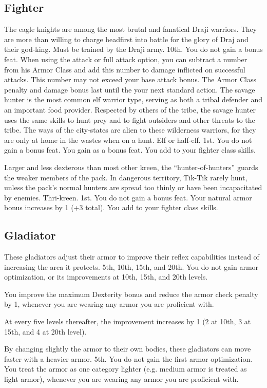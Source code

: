 \subsection{Fighter}
{The eagle knights are among the most brutal and fanatical Draji warriors. They are more than willing to charge headfirst into battle for the glory of Draj and their god-king.}
{Must be trained by the Draji army.}
{10th.}
{You do not gain a bonus feat.}
{
	When using the attack or full attack option, you can subtract a number from his Armor Class and add this number to damage inflicted on successful attacks. This number may not exceed your base attack bonus. The Armor Class penalty and damage bonus last until the your next standard action.
}
{The savage hunter is the most common elf warrior type, serving as both a tribal defender and an important food provider. Respected by others of the tribe, the savage hunter uses the same skills to hunt prey and to fight outsiders and other threats to the tribe. The ways of the city-states are alien to these wilderness warriors, for they are only at home in the wastes when on a hunt.}
{Elf or half-elf.}
{1st.}
{You do not gain a bonus feat.}
{
	You gain  as a bonus feat. You add  to your fighter class skills.
}

{Larger and less dexterous than most other kreen, the ``hunter-of-hunters'' guards the weaker members of the pack. In dangerous territory, Tik-Tik rarely hunt, unless the pack's normal hunters are spread too thinly or have been incapacitated by enemies.}
{Thri-kreen.}
{1st.}
{You do not gain a bonus feat.}
{
	Your natural armor bonus increases by 1 (+3 total). You add  to your fighter class skills.
}

\subsection{Gladiator}
{These gladiators adjust their armor to improve their reflex capabilities instead of increasing the area it protects.}
{}
{5th, 10th, 15th, and 20th.}
{You do not gain armor optimization, or its improvements at 10th, 15th, and 20th levels.}
{
	You improve the maximum Dexterity bonus and reduce the armor check penalty by 1, whenever you are wearing any armor you are proficient with.

	At every five levels thereafter, the improvement increases by 1 (2 at 10th, 3 at 15th, and 4 at 20th level).
}
{By changing slightly the armor to their own bodies, these gladiators can move faster with a heavier armor.}
{}
{5th.}
{You do not gain the first armor optimization.}
{
	You treat the armor as one category lighter (e.g. medium armor is treated as light armor), whenever you are wearing any armor you are proficient with.
}

